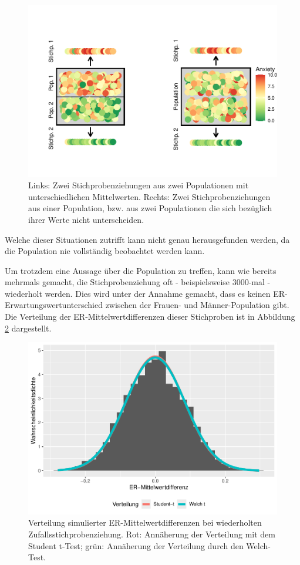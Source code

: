 \documentclass[
]{book}
\theoremstyle{definition}
\theoremstyle{definition}
\theoremstyle{definition}
\theoremstyle{definition}
\theoremstyle{remark}
\begin{document}
\begin{figure}
\centering
\includegraphics{aps_statistik1_files/figure-latex/exm-breakup-bagplot-1.pdf}
\caption{\label{fig:exm-breakup-bagplot}Links: Zwei Stichprobenziehungen aus zwei Populationen mit unterschiedlichen Mittelwerten. Rechts: Zwei Stichprobenziehungen aus einer Population, bzw. aus zwei Populationen die sich bezüglich ihrer Werte nicht unterscheiden.}
\end{figure}

Welche dieser Situationen zutrifft kann nicht genau herausgefunden werden, da die Population nie vollständig beobachtet werden kann.

Um trotzdem eine Aussage über die Population zu treffen, kann wie bereits mehrmals gemacht, die Stichprobenziehung oft - beispielsweise \(3000\)-mal - wiederholt werden. Dies wird unter der Annahme gemacht, dass es keinen ER-Erwartungswertunterschied zwischen der Frauen- und Männer-Population gibt. Die Verteilung der ER-Mittelwertdifferenzen dieser Stichproben ist in Abbildung \ref{fig:exm-breakup-hist} dargestellt.

\begin{figure}
\centering
\includegraphics{aps_statistik1_files/figure-latex/exm-breakup-hist-1.pdf}
\caption{\label{fig:exm-breakup-hist}Verteilung simulierter ER-Mittelwertdifferenzen bei wiederholten Zufallsstichprobenziehung. Rot: Annäherung der Verteilung mit dem Student t-Test; grün: Annäherung der Verteilung durch den Welch-Test.}
\end{figure}
\end{document}
